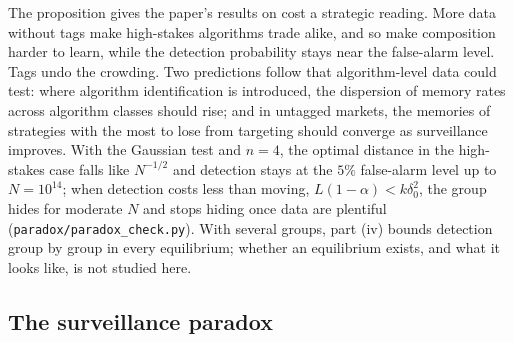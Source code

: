 \documentclass[12pt]{article}
\theoremstyle{definition}
\theoremstyle{remark}
\begin{document}
The proposition gives the paper's results on cost a strategic reading. More data without tags make high-stakes algorithms trade alike, and so make composition harder to learn, while the detection probability stays near the false-alarm level. Tags undo the crowding. Two predictions follow that algorithm-level data could test: where algorithm identification is introduced, the dispersion of memory rates across algorithm classes should rise; and in untagged markets, the memories of strategies with the most to lose from targeting should converge as surveillance improves. With the Gaussian test and $n=4$, the optimal distance in the high-stakes case falls like $N^{-1/2}$ and detection stays at the $5\%$ false-alarm level up to $N=10^{14}$; when detection costs less than moving, $L(1-\alpha)<k\delta_0^2$, the group hides for moderate $N$ and stops hiding once data are plentiful (\nolinkurl{paradox/paradox_check.py}). With several groups, part (iv) bounds detection group by group in every equilibrium; whether an equilibrium exists, and what it looks like, is not studied here.

\subsection{The surveillance paradox}\label{app:paradox}
\end{document}
